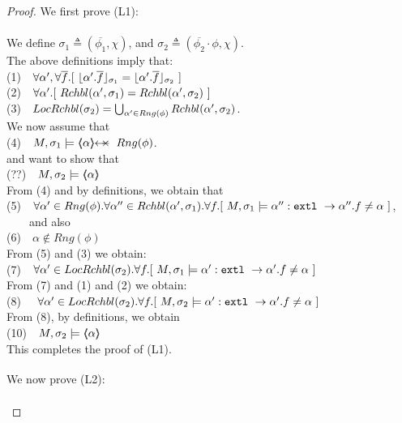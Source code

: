 \begin{proof}
We first prove (L1): \\
~ \\
We define $\sigma_1 \triangleq (\overline {\phi_1},\chi)$, and  $\sigma_2 \triangleq (\overline {\phi_2}\cdot \phi,\chi) $.\\
The above definitions imply that: \\
\SP (1)\ \ $\forall \alpha',\forall \overline f.[\  \interpret {\sigma_1} {\alpha'.\overline f} =  \interpret {\sigma_2} {\alpha'.\overline f}\ ]$\\
\SP (2)\ \ $\forall \alpha'.[\  \Relevant {\alpha'} {\sigma_1} = \Relevant {\alpha'} {\sigma_2}\ ]$\\
\SP (3)\ \ $\LRelevantO {\sigma_2} = \bigcup_{\alpha'\in Rng(\phi)} \Relevant {\alpha'} {\sigma_2} $.\\
We now assume that\\
\SP (4)\ \ $M, \sigma_1 \models \protectedFrom \alpha {Rng(\phi)}$.\\
and want to show that\\
\SP (??)\ \ $M, \sigma_2 \models \inside \alpha$\\
From (4) and  by definitions, we obtain that\\
\SP (5)\ \ $\forall \alpha'\in Rng(\phi).\forall \alpha''\in \Relevant {\alpha'} {\sigma_1}.\forall f.[ \   M, \sigma_1 \models \alpha'':\prg{extl}\ \rightarrow \alpha''.f  \neq \alpha\ ]$, \ \ \ \ and also\\
\SP (6)\ \ $\alpha \notin Rng(\phi)$\\
From (5) and (3) we obtain:\\
\SP (7)\ \  $\forall \alpha' \in \LRelevantO {\sigma_2}.\forall f.[ \   M, \sigma_1 \models \alpha':\prg{extl}\ \rightarrow \alpha'.f  \neq \alpha\ ]$\\
From (7) and (1) and (2) we obtain:\\
\SP (8) \ \  $\forall \alpha' \in \LRelevantO {\sigma_2}.\forall f.[ \   M, \sigma_2 \models \alpha':\prg{extl}\ \rightarrow \alpha'.f  \neq \alpha\ ]$\\
From (8), by definitions, we obtain\\
 \SP (10)\ \ $M, \sigma_2 \models \inside \alpha$\\
 This completes the proof of (L1).
 \\
  $\strut ~ \ $\\
  We now prove (L2): \\
  ~ \\

\end{proof}
